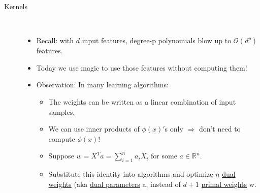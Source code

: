 \documentclass[10pt]{article}
\begin{document}
\begin{description}
	\item[Kernels]
	\
	\begin{itemize}
		\item Recall: with $d$ input features, degree-p polynomials blow up to $\mathcal{O}(d^{p})$ features.
		\item Today we use magic to use those features without computing them!
		\item Observation: In many learning algorithms:
			\begin{itemize}
				\item The weights can be written as a linear combination of input samples.
				\item We can use inner products of $\phi(x)'$s only $\Rightarrow$ don't need to compute $\phi(x)$!
				\item Suppose $w = X^{T}a = \sum_{i=1}^{n} a_{i}X_{i}$ for some $a \in \mathbb{R}^{n}$.
				\item Substitute this identity into algorithms and optimize $n$ \underline{dual weights} (aka \underline{dual parameters} a, instead of $d+1$ \underline{primal weights} w.
			\end{itemize}
	\end{itemize}
	

\end{description}
\end{document}
